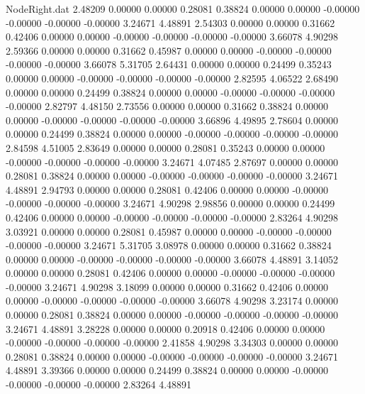 \begin{filecontents}{NodeRight.dat}
   2.48209    0.00000    0.00000     0.28081    0.38824    0.00000    0.00000   -0.00000   -0.00000   -0.00000   -0.00000    3.24671    4.48891
   2.54303    0.00000    0.00000     0.31662    0.42406    0.00000    0.00000   -0.00000   -0.00000   -0.00000   -0.00000    3.66078    4.90298
   2.59366    0.00000    0.00000     0.31662    0.45987    0.00000    0.00000   -0.00000   -0.00000   -0.00000   -0.00000    3.66078    5.31705
   2.64431    0.00000    0.00000     0.24499    0.35243    0.00000    0.00000   -0.00000   -0.00000   -0.00000   -0.00000    2.82595    4.06522
   2.68490    0.00000    0.00000     0.24499    0.38824    0.00000    0.00000   -0.00000   -0.00000   -0.00000   -0.00000    2.82797    4.48150
   2.73556    0.00000    0.00000     0.31662    0.38824    0.00000    0.00000   -0.00000   -0.00000   -0.00000   -0.00000    3.66896    4.49895
   2.78604    0.00000    0.00000     0.24499    0.38824    0.00000    0.00000   -0.00000   -0.00000   -0.00000   -0.00000    2.84598    4.51005
   2.83649    0.00000    0.00000     0.28081    0.35243    0.00000    0.00000   -0.00000   -0.00000   -0.00000   -0.00000    3.24671    4.07485
   2.87697    0.00000    0.00000     0.28081    0.38824    0.00000    0.00000   -0.00000   -0.00000   -0.00000   -0.00000    3.24671    4.48891
   2.94793    0.00000    0.00000     0.28081    0.42406    0.00000    0.00000   -0.00000   -0.00000   -0.00000   -0.00000    3.24671    4.90298
   2.98856    0.00000    0.00000     0.24499    0.42406    0.00000    0.00000   -0.00000   -0.00000   -0.00000   -0.00000    2.83264    4.90298
   3.03921    0.00000    0.00000     0.28081    0.45987    0.00000    0.00000   -0.00000   -0.00000   -0.00000   -0.00000    3.24671    5.31705
   3.08978    0.00000    0.00000     0.31662    0.38824    0.00000    0.00000   -0.00000   -0.00000   -0.00000   -0.00000    3.66078    4.48891
   3.14052    0.00000    0.00000     0.28081    0.42406    0.00000    0.00000   -0.00000   -0.00000   -0.00000   -0.00000    3.24671    4.90298
   3.18099    0.00000    0.00000     0.31662    0.42406    0.00000    0.00000   -0.00000   -0.00000   -0.00000   -0.00000    3.66078    4.90298
   3.23174    0.00000    0.00000     0.28081    0.38824    0.00000    0.00000   -0.00000   -0.00000   -0.00000   -0.00000    3.24671    4.48891
   3.28228    0.00000    0.00000     0.20918    0.42406    0.00000    0.00000   -0.00000   -0.00000   -0.00000   -0.00000    2.41858    4.90298
   3.34303    0.00000    0.00000     0.28081    0.38824    0.00000    0.00000   -0.00000   -0.00000   -0.00000   -0.00000    3.24671    4.48891
   3.39366    0.00000    0.00000     0.24499    0.38824    0.00000    0.00000   -0.00000   -0.00000   -0.00000   -0.00000    2.83264    4.48891

\end{filecontents}

